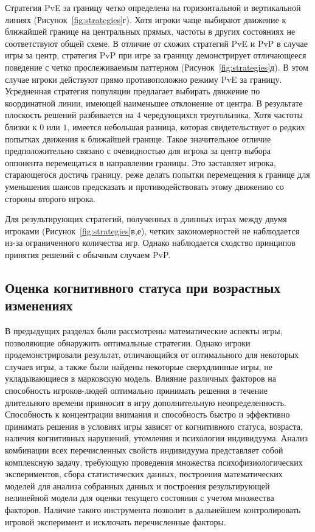 Стратегия PvE за границу четко определена на горизонтальной и вертикальной линиях (Рисунок~\cref{fig:strategies}г). Хотя игроки чаще выбирают движение к ближайшей границе на центральных прямых, частоты в других состояниях не соответствуют общей схеме. В отличие от схожих стратегий PvE и PvP в случае игры за центр, стратегия PvP при игре за границу демонстрирует отличающееся поведение с четко прослеживаемым паттерном (Рисунок~\cref{fig:strategies}д). В этом случае игроки действуют прямо противоположно режиму PvE за границу. Усредненная стратегия популяции предлагает выбирать движение по координатной линии, имеющей наименьшее отклонение от центра. В результате плоскость решений разбивается на $4$ чередующихся треугольника. Хотя частоты близки к $0$ или $1$, имеется небольшая разница, которая свидетельствует о редких попытках движения к ближайшей границе. Такое значительное отличие предположительно связано с очевидностью для игрока за центр выбора оппонента перемещаться в направлении границы. Это заставляет игрока, старающегося достичь границу, реже делать попытки перемещения к границе для уменьшения шансов предсказать и противодействовать этому движению со стороны второго игрока.

Для результирующих стратегий, полученных в длинных играх между двумя игроками (Рисунок~\cref{fig:strategies}в,е), четких закономерностей не наблюдается из-за ограниченного количества игр. Однако наблюдается сходство принципов принятия решений с обычным случаем PvP.

\subsection{Оценка когнитивного статуса при возрастных изменениях}\label{sec:ch3/sec4/sub6}

В предыдущих разделах были рассмотрены математические аспекты игры, позволяющие обнаружить оптимальные стратегии. Однако игроки продемонстрировали результат, отличающийся от оптимального для некоторых случаев игры, а также были найдены некоторые сверхдлинные игры, не укладывающиеся в марковскую модель. Влияние различных факторов на способность игроков-людей оптимально принимать решения в течение длительного времени привносит в игру дополнительную неопределенность. Способность к концентрации внимания и способность быстро и эффективно принимать решения в условиях игры зависят от когнитивного статуса, возраста, наличия когнитивных нарушений, утомления и психологии индивидуума. Анализ комбинации всех перечисленных свойств индивидуума представляет собой комплексную задачу, требующую проведения множества психофизиологических экспериментов, сбора статистических данных, построения математических моделей для анализа собранных данных и построения результирующей нелинейной модели для оценки текущего состояния с учетом множества факторов. Наличие такого инструмента позволит в дальнейшем контролировать игровой эксперимент и исключать перечисленные факторы. 

